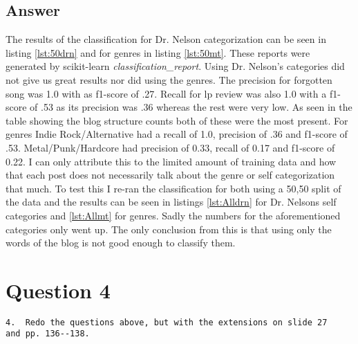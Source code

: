 \documentclass[letterpaper,10pt]{article}
\begin{document}
\subsection*{Answer}
The results of the classification for Dr. Nelson categorization can be seen in listing
\hyperref[lst:50drn]{\ref{lst:50drn}} and for genres in listing \hyperref[lst:50mt]{\ref{lst:50mt}}. These reports were generated by scikit-learn \emph{classification\_report}. Using Dr. Nelson's categories did not give us great results nor did using the genres. The precision for forgotten song was 1.0 with as f1-score of .27. Recall for lp review was also 1.0 with a f1-score of .53 as its precision was .36 whereas the rest were very low. As seen in the table showing the blog structure counts both of these were the most present. For genres Indie Rock/Alternative had a recall of 1.0, precision of .36 and f1-score of .53. Metal/Punk/Hardcore had precision of 0.33, recall of 0.17 and f1-score of 0.22. I can only attribute this to the limited amount of training data and how that each post does not necessarily talk about the genre or self categorization that much. To test this I re-ran the classification for both using a 50,50 split of the data and the results can be seen in listings \hyperref[lst:Alldrn]{\ref{lst:Alldrn}} for Dr. Nelsons self categories and \hyperref[lst:Allmt]{\ref{lst:Allmt}} for genres.\newline \newline
Sadly the numbers for the aforementioned categories only went up. The only conclusion from this is that using only the words of the blog is not good enough to classify them.




  



 
\newpage
\section*{Question 4}
\begin{verbatim}
4.  Redo the questions above, but with the extensions on slide 27
and pp. 136--138.
\end{verbatim}
\end{document}
